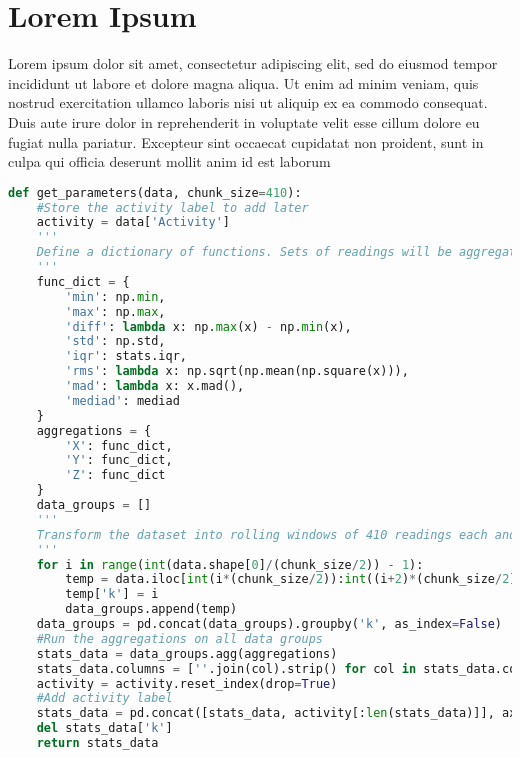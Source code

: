 \section{Lorem Ipsum}
Lorem ipsum dolor sit amet, consectetur adipiscing elit, sed do eiusmod tempor incididunt ut labore et dolore magna aliqua. Ut enim ad minim veniam, quis nostrud exercitation ullamco laboris nisi ut aliquip ex ea commodo consequat. Duis aute irure dolor in reprehenderit in voluptate velit esse cillum dolore eu fugiat nulla pariatur. Excepteur sint occaecat cupidatat non proident, sunt in culpa qui officia deserunt mollit anim id est laborum 

\begin{lstlisting}[language=Python]
def get_parameters(data, chunk_size=410):
	#Store the activity label to add later
	activity = data['Activity']
    '''
    Define a dictionary of functions. Sets of readings will be aggregated as per these functions
    '''
	func_dict = {
		'min': np.min,
		'max': np.max,
		'diff': lambda x: np.max(x) - np.min(x),
		'std': np.std,
		'iqr': stats.iqr,
		'rms': lambda x: np.sqrt(np.mean(np.square(x))),
		'mad': lambda x: x.mad(),
		'mediad': mediad
	}
	aggregations = {
		'X': func_dict,
		'Y': func_dict,
		'Z': func_dict
	}
	data_groups = []
    '''
    Transform the dataset into rolling windows of 410 readings each and store them in a Pandas data group.
    '''
	for i in range(int(data.shape[0]/(chunk_size/2)) - 1):
		temp = data.iloc[int(i*(chunk_size/2)):int((i+2)*(chunk_size/2))]
		temp['k'] = i
		data_groups.append(temp)
	data_groups = pd.concat(data_groups).groupby('k', as_index=False)
    #Run the aggregations on all data groups
	stats_data = data_groups.agg(aggregations)
	stats_data.columns = [''.join(col).strip() for col in stats_data.columns.values]
	activity = activity.reset_index(drop=True)
    #Add activity label
	stats_data = pd.concat([stats_data, activity[:len(stats_data)]], axis=1)
	del stats_data['k']
	return stats_data
\end{lstlisting}


